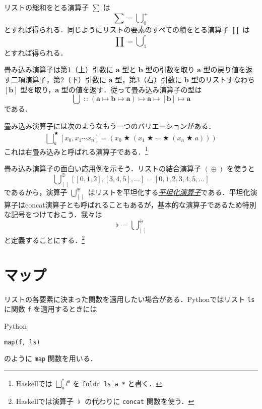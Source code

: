 \documentclass[a4paper,draft]{jsbook}
\newcommand{\programminglanguage}[1]{\textsf{#1}}
\newcommand{\haskell}{\programminglanguage{Haskell}}
\newcommand{\python}{\programminglanguage{Python}}
\newcommand{\keyword}[1]{{\underline{\emph{#1}}}}
\newcommand{\code}[1]{\texttt{#1}}
\newenvironment{pythoncode}{\begin{itembox}[r]{\python}}{\end{itembox}}
\newcommand{\mType}[1]{\mathbf{#1}}
\newcommand{\mListType}[1]{[\mType{#1}]}
\newcommand{\mEmptyList}{{[\,]}}
\newcommand{\mListWith}[1]{\left[#1\right]}
\newcommand{\mList}[1]{{#1}^\mathrm{s}}
\DeclareMathOperator{\mIn}{{:\!:}}
\DeclareMathOperator{\mMapsTo}{\mapsto}
\DeclareMathOperator{\mBinOp}{\bigstar}
\DeclareMathOperator*{\mFoldLeft}{\bigcup}
\DeclareMathOperator*{\mFoldRight}{\bigsqcup}
\DeclareMathOperator{\mConcat}{\flat}
\DeclareMathOperator{\mAppend}{\oplus}
\newcommand{\mProjection}[2]{#1\mMapsTo#2}
\begin{document}
リストの総和をとる演算子 $\sum$ は
\begin{equation}
\sum=\mFoldLeft^+_0
\end{equation}
とすれば得られる．同じようにリストの要素のすべての積をとる演算子 $\prod$ は
\begin{equation}
\prod=\mFoldLeft^*_1
\end{equation}
とすれば得られる．

畳み込み演算子は第1（上）引数に $\mType{a}$ 型と $\mType{b}$ 型の引数を取り $\mType{a}$ 型の戻り値を返す二項演算子，第2（下）引数に $\mType{a}$ 型，第3（右）引数に $\mType{b}$ 型のリストすなわち $\mListType{b}$ 型を取り，$\mType{a}$ 型の値を返す．従って畳み込み演算子の型は
\begin{equation}
\mFoldLeft
\mIn{}
\mProjection{(\mProjection{\mType{a}}{\mProjection{\mType{b}}{\mType{a}}})}
{\mProjection{\mType{a}}{\mProjection{\mListType{b}}{\mType{a}}}}
\end{equation}
である．

畳み込み演算子には次のようなもう一つのバリエーションがある．
\begin{equation}
\mFoldRight^{\mBinOp}_{a}\mListWith{x_0,x_1\dotsb x_n}
=(x_0\mBinOp(x_1\mBinOp\dotsb\mBinOp(x_n\mBinOp a)))
\end{equation}
これは右畳み込みと呼ばれる演算子である．\footnote{\haskell では $\mFoldRight^{*}_a\mList{l}$ を \code{foldr ls a *} と書く．}

畳み込み演算子の面白い応用例を示そう．リストの結合演算子 $(\mAppend)$ を使うと
\begin{equation}
\mFoldLeft_{\mEmptyList}^{\mAppend}\mListWith{\mListWith{0,1,2},\mListWith{3,4,5},\dots}=\mListWith{0,1,2,3,4,5,\dots}
\end{equation}
であるから，演算子 $\mFoldLeft_{\mEmptyList}^{\mAppend}$ はリストを平坦化する\keyword{平坦化演算子}である．平坦化演算子はconcat演算子とも呼ばれることもあるが，基本的な演算子であるため特別な記号をつけておこう．我々は
\begin{equation}
\mConcat=\mFoldLeft_{\mEmptyList}^{\mAppend}
\end{equation}
と定義することにする．\footnote{\haskell では演算子 $\mConcat$ の代わりに \code{concat} 関数を使う．}

\section{マップ}

リストの各要素に決まった関数を適用したい場合がある．\python ではリスト \code{ls} に関数 \code{f} を適用するときには
\begin{pythoncode}
\begin{verbatim}
map(f, ls)
\end{verbatim}
\end{pythoncode}
のように \code{map} 関数を用いる．
\end{document}
